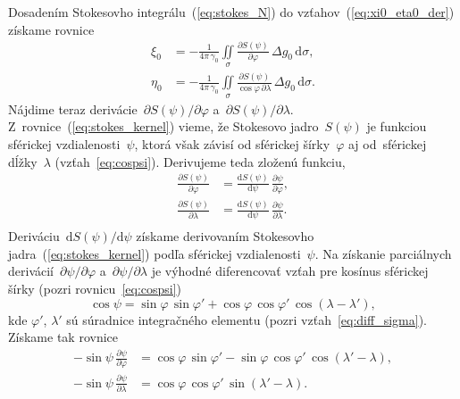 \documentclass[a4paper, 12pt]{book}
\newcommand{\diff}{\mathrm d}
\begin{document}
Dosadením Stokesovho integrálu~(\ref{eq:stokes_N}) do 
vzťahov~(\ref{eq:xi0_eta0_der}) získame rovnice
%
\begin{equation}
\label{eq:vm}
\begin{split}
\xi_0 &= -\frac{1}{4\pi\,\gamma_0} \iint\limits_\sigma \frac{\partial 
S(\psi)}{\partial \varphi} \, \Delta g_0 \, \diff\sigma{,}\\
\eta_0 &= -\frac{1}{4\pi\,\gamma_0} \iint\limits_\sigma \frac{\partial 
S(\psi)}{\cos\varphi \, \partial \lambda} \, \Delta g_0 \, \diff\sigma{.}
\end{split}
\end{equation}
%
Nájdime teraz derivácie~$\partial S(\psi) \slash \partial\varphi$ a~$\partial 
S(\psi) \slash \partial\lambda$.  Z~rovnice~(\ref{eq:stokes_kernel}) vieme, že 
Stokesovo jadro~$S(\psi)$ je funkciou sférickej vzdialenosti~$\psi$, ktorá však 
závisí od sférickej šírky~$\varphi$ aj od~sférickej dĺžky~$\lambda$ 
(vzťah~\ref{eq:cospsi}).  Derivujeme teda zloženú funkciu,
%
\begin{equation}
\label{eq:stokes_kernel_partials}
\begin{split}
\frac{\partial S(\psi)}{\partial \varphi} &= \frac{\diff S(\psi)}{\diff \psi} 
\, \frac{\partial\psi}{\partial\varphi}{,}\\
%
\frac{\partial S(\psi)}{\partial \lambda} &= \frac{\diff S(\psi)}{\diff \psi} 
\, \frac{\partial\psi}{\partial\lambda}{.}\\
\end{split}
\end{equation}
%
Deriváciu~$\diff S(\psi) \slash \diff \psi$ získame derivovaním Stokesovho 
jadra~(\ref{eq:stokes_kernel}) podľa sférickej vzdialenosti~$\psi$.  Na 
získanie parciálnych derivácií~$\partial\psi \slash \partial\varphi$ 
a~$\partial\psi \slash \partial\lambda$ je výhodné diferencovať vzťah pre 
kosínus sférickej šírky (pozri rovnicu~\ref{eq:cospsi})
%
\begin{equation}
\cos\psi = \sin\varphi \, \sin\varphi' + \cos\varphi \, \cos\varphi' \,
\cos(\lambda - \lambda'){,}
\end{equation}
%
kde $\varphi'$, $\lambda'$ sú súradnice integračného elementu (pozri 
vzťah~\ref{eq:diff_sigma}).  Získame tak rovnice
%
\begin{equation}
\label{eq:vm_aux}
\begin{split}
-\sin\psi \, \frac{\partial \psi}{\partial \varphi} &= \cos\varphi \, 
\sin\varphi' - \sin\varphi \, \cos\varphi' \, \cos(\lambda' - \lambda) {,}\\
-\sin\psi \, \frac{\partial \psi}{\partial \lambda} &= \cos\varphi \, 
\cos\varphi' \, \sin(\lambda' - \lambda){.}
\end{split}
\end{equation}
\end{document}
